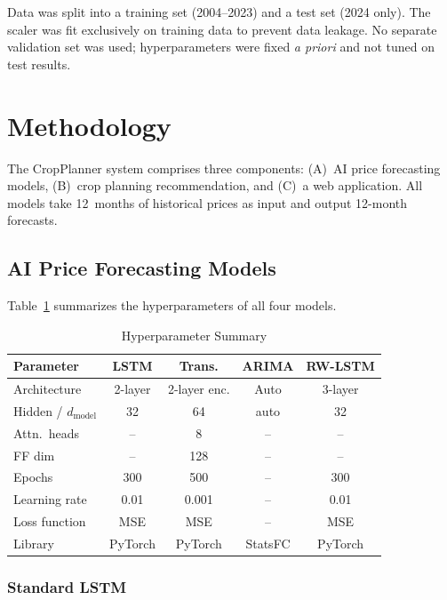 \documentclass[conference]{IEEEtran}
\begin{document}
Data was split into a training set (2004--2023) and a test set (2024 only). The scaler was fit exclusively on training data to prevent data leakage. No separate validation set was used; hyperparameters were fixed \textit{a priori} and not tuned on test results.

\section{Methodology}

The CropPlanner system comprises three components: (A)~AI price forecasting models, (B)~crop planning recommendation, and (C)~a web application. All models take 12~months of historical prices as input and output 12-month forecasts.

\subsection{AI Price Forecasting Models}

Table~\ref{tab:hyperparams} summarizes the hyperparameters of all four models.

\begin{table}[htbp]
  \centering
  \caption{Hyperparameter Summary}
  \label{tab:hyperparams}
  \begin{tabular}{lcccc}
    \toprule
    \textbf{Parameter} & \textbf{LSTM} & \textbf{Trans.} & \textbf{ARIMA} & \textbf{RW-LSTM} \\
    \midrule
    Architecture & 2-layer & 2-layer enc. & Auto & 3-layer \\
    Hidden / $d_{\text{model}}$ & 32 & 64 & auto & 32 \\
    Attn.\ heads & -- & 8 & -- & -- \\
    FF dim & -- & 128 & -- & -- \\
    Epochs & 300 & 500 & -- & 300 \\
    Learning rate & 0.01 & 0.001 & -- & 0.01 \\
    Loss function & MSE & MSE & -- & MSE \\
    Library & PyTorch & PyTorch & StatsFC & PyTorch \\
    \bottomrule
  \end{tabular}
\end{table}

\subsubsection{Standard LSTM}
\end{document}
